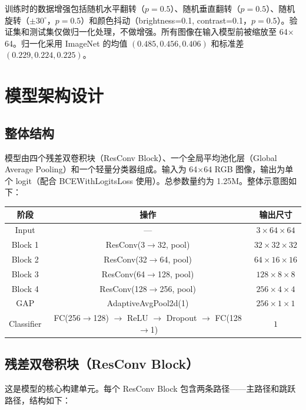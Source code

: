 \documentclass[12pt,a4paper]{ctexart}
\begin{document}
训练时的数据增强包括随机水平翻转（$p=0.5$）、随机垂直翻转（$p=0.5$）、随机旋转（$\pm 30^\circ$，$p=0.5$）和颜色抖动（brightness=0.1, contrast=0.1，$p=0.5$）。验证集和测试集仅做归一化处理，不做增强。所有图像在输入模型前被缩放至 64$\times$64。归一化采用 ImageNet 的均值 $(0.485, 0.456, 0.406)$ 和标准差 $(0.229, 0.224, 0.225)$。

\section{模型架构设计}

\subsection{整体结构}

模型由四个残差双卷积块（ResConv Block）、一个全局平均池化层（Global Average Pooling）和一个轻量分类器组成。输入为 64$\times$64 RGB 图像，输出为单个 logit（配合 BCEWithLogitsLoss 使用）。总参数量约为 1.25M。整体示意图如下：

\begin{center}
\begin{tabular}{c|c|c}
\toprule
阶段 & 操作 & 输出尺寸 \\
\midrule
Input  & —          & $3 \times 64 \times 64$ \\
Block 1 & ResConv(3$\rightarrow$32, pool)  & $32 \times 32 \times 32$ \\
Block 2 & ResConv(32$\rightarrow$64, pool)  & $64 \times 16 \times 16$ \\
Block 3 & ResConv(64$\rightarrow$128, pool) & $128 \times 8 \times 8$ \\
Block 4 & ResConv(128$\rightarrow$256, pool) & $256 \times 4 \times 4$ \\
GAP    & AdaptiveAvgPool2d(1)               & $256 \times 1 \times 1$ \\
Classifier & FC(256$\rightarrow$128) $\rightarrow$ ReLU $\rightarrow$ Dropout $\rightarrow$ FC(128$\rightarrow$1) & $1$ \\
\bottomrule
\end{tabular}
\end{center}

\subsection{残差双卷积块（ResConv Block）}

这是模型的核心构建单元。每个 ResConv Block 包含两条路径——主路径和跳跃路径，结构如下：
\end{document}

